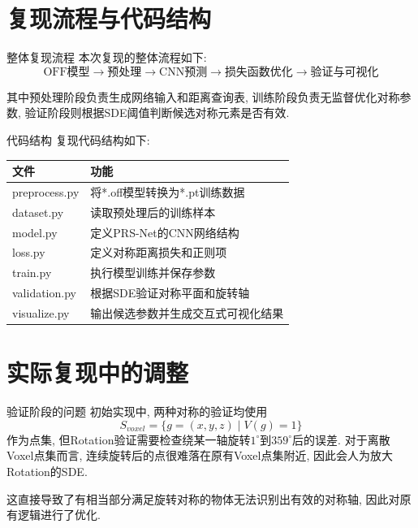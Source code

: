 \documentclass[UTF8, aspectratio=169, 11pt]{ctexbeamer}
\begin{document}
    \section{复现流程与代码结构}

    \begin{frame}{整体复现流程}
        本次复现的整体流程如下:
        \begin{equation*}
            \text{OFF模型}
            \rightarrow \text{预处理}
            \rightarrow \text{CNN预测}
            \rightarrow \text{损失函数优化}
            \rightarrow \text{验证与可视化}
        \end{equation*}

        其中预处理阶段负责生成网络输入和距离查询表, 训练阶段负责无监督优化对称参数, 验证阶段则根据SDE阈值判断候选对称元素是否有效.
    \end{frame}

    \begin{frame}{代码结构}
        复现代码结构如下:
        \begin{table}
            \centering
            \begin{tabular}{ll}
                \toprule
                文件 & 功能 \\
                \midrule
                preprocess.py & 将*.off模型转换为*.pt训练数据 \\
                dataset.py & 读取预处理后的训练样本 \\
                model.py & 定义PRS-Net的CNN网络结构 \\
                loss.py & 定义对称距离损失和正则项 \\
                train.py & 执行模型训练并保存参数 \\
                validation.py & 根据SDE验证对称平面和旋转轴 \\
                visualize.py & 输出候选参数并生成交互式可视化结果 \\
                \bottomrule
            \end{tabular}
        \end{table}
    \end{frame}

    \section{实际复现中的调整}

    \begin{frame}{验证阶段的问题}
        初始实现中, 两种对称的验证均使用
        \begin{equation}
            S_{voxel}=\{g=(x,y,z)\mid V(g)=1\}
        \end{equation}
        作为点集, 但Rotation验证需要检查绕某一轴旋转$1^\circ$到$359^\circ$后的误差. 对于离散Voxel点集而言, 连续旋转后的点很难落在原有Voxel点集附近, 因此会人为放大Rotation的SDE.

        这直接导致了有相当部分满足旋转对称的物体无法识别出有效的对称轴, 因此对原有逻辑进行了优化.
    \end{frame}
\end{document}
